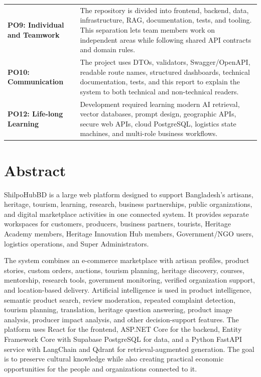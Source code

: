 \documentclass[12pt,a4paper]{report}
\begin{document}
\begin{longtable}{>{\bfseries}p{}p{}}
PO9: Individual and Teamwork &
The repository is divided into frontend, backend, data, infrastructure, RAG, documentation, tests, and tooling. This separation lets team members work on independent areas while following shared API contracts and domain rules. \\

PO10: Communication &
The project uses DTOs, validators, Swagger/OpenAPI, readable route names, structured dashboards, technical documentation, tests, and this report to explain the system to both technical and non-technical readers. \\

PO12: Life-long Learning &
Development required learning modern AI retrieval, vector databases, prompt design, geographic APIs, secure web APIs, cloud PostgreSQL, logistics state machines, and multi-role business workflows. \\
\bottomrule
\end{longtable}

\chapter*{Abstract}

ShilpoHubBD is a large web platform designed to support Bangladesh's artisans, heritage, tourism, learning, research, business partnerships, public organizations, and digital marketplace activities in one connected system. It provides separate workspaces for customers, producers, business partners, tourists, Heritage Academy members, Heritage Innovation Hub members, Government/NGO users, logistics operations, and Super Administrators.

The system combines an e-commerce marketplace with artisan profiles, product stories, custom orders, auctions, tourism planning, heritage discovery, courses, mentorship, research tools, government monitoring, verified organization support, and location-based delivery. Artificial intelligence is used in product intelligence, semantic product search, review moderation, repeated complaint detection, tourism planning, translation, heritage question answering, product image analysis, producer impact analysis, and other decision-support features. The platform uses React for the frontend, ASP.NET Core for the backend, Entity Framework Core with Supabase PostgreSQL for data, and a Python FastAPI service with LangChain and Qdrant for retrieval-augmented generation. The goal is to preserve cultural knowledge while also creating practical economic opportunities for the people and organizations connected to it.
\end{document}
